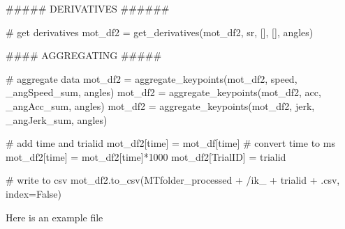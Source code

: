 \documentclass[
  letterpaper,
  DIV=11,
  numbers=noendperiod]{scrreprt}
\newenvironment{Shaded}{\begin{snugshade}}{\end{snugshade}}
\newcommand{\CommentTok}[1]{\textcolor[rgb]{0.37,0.37,0.37}{#1}}
\newcommand{\DecValTok}[1]{\textcolor[rgb]{0.68,0.00,0.00}{#1}}
\newcommand{\NormalTok}[1]{\textcolor[rgb]{0.00,0.23,0.31}{#1}}
\newcommand{\OperatorTok}[1]{\textcolor[rgb]{0.37,0.37,0.37}{#1}}
\newcommand{\StringTok}[1]{\textcolor[rgb]{0.13,0.47,0.30}{#1}}
\newcommand{\VariableTok}[1]{\textcolor[rgb]{0.07,0.07,0.07}{#1}}
\begin{document}
\begin{Shaded}
\begin{Highlighting}[]
    \CommentTok{\#\#\#\#\# DERIVATIVES \#\#\#\#\#\#}

    \CommentTok{\# get derivatives}
\NormalTok{    mot\_df2 }\OperatorTok{=}\NormalTok{ get\_derivatives(mot\_df2, sr, [], [], }\StringTok{\textquotesingle{}angles\textquotesingle{}}\NormalTok{)}

    \CommentTok{\#\#\#\# AGGREGATING \#\#\#\#\#}

    \CommentTok{\# aggregate data}
\NormalTok{    mot\_df2 }\OperatorTok{=}\NormalTok{ aggregate\_keypoints(mot\_df2, }\StringTok{\textquotesingle{}speed\textquotesingle{}}\NormalTok{, }\StringTok{\textquotesingle{}\_angSpeed\_sum\textquotesingle{}}\NormalTok{, }\StringTok{\textquotesingle{}angles\textquotesingle{}}\NormalTok{)}
\NormalTok{    mot\_df2 }\OperatorTok{=}\NormalTok{ aggregate\_keypoints(mot\_df2, }\StringTok{\textquotesingle{}acc\textquotesingle{}}\NormalTok{, }\StringTok{\textquotesingle{}\_angAcc\_sum\textquotesingle{}}\NormalTok{, }\StringTok{\textquotesingle{}angles\textquotesingle{}}\NormalTok{)}
\NormalTok{    mot\_df2 }\OperatorTok{=}\NormalTok{ aggregate\_keypoints(mot\_df2, }\StringTok{\textquotesingle{}jerk\textquotesingle{}}\NormalTok{, }\StringTok{\textquotesingle{}\_angJerk\_sum\textquotesingle{}}\NormalTok{, }\StringTok{\textquotesingle{}angles\textquotesingle{}}\NormalTok{)}

    \CommentTok{\# add time and trialid}
\NormalTok{    mot\_df2[}\StringTok{\textquotesingle{}time\textquotesingle{}}\NormalTok{] }\OperatorTok{=}\NormalTok{ mot\_df[}\StringTok{\textquotesingle{}time\textquotesingle{}}\NormalTok{]}
    \CommentTok{\# convert time to ms}
\NormalTok{    mot\_df2[}\StringTok{\textquotesingle{}time\textquotesingle{}}\NormalTok{] }\OperatorTok{=}\NormalTok{ mot\_df2[}\StringTok{\textquotesingle{}time\textquotesingle{}}\NormalTok{]}\OperatorTok{*}\DecValTok{1000}
\NormalTok{    mot\_df2[}\StringTok{\textquotesingle{}TrialID\textquotesingle{}}\NormalTok{] }\OperatorTok{=}\NormalTok{ trialid}

    \CommentTok{\# write to csv}
\NormalTok{    mot\_df2.to\_csv(MTfolder\_processed }\OperatorTok{+} \StringTok{\textquotesingle{}/ik\_\textquotesingle{}} \OperatorTok{+}\NormalTok{ trialid }\OperatorTok{+} \StringTok{\textquotesingle{}.csv\textquotesingle{}}\NormalTok{, index}\OperatorTok{=}\VariableTok{False}\NormalTok{)}
\end{Highlighting}
\end{Shaded}

Here is an example file
\end{document}
